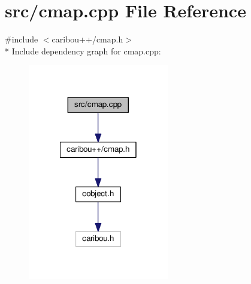 \section{src/cmap.cpp File Reference}
\label{cmap_8cpp}
{\ttfamily \#include $<$caribou++/cmap.\-h$>$}\\*
Include dependency graph for cmap.\-cpp\-:\nopagebreak
\begin{figure}[H]
\begin{center}
\leavevmode
\includegraphics[width=174pt]{cmap_8cpp__incl}
\end{center}
\end{figure}
